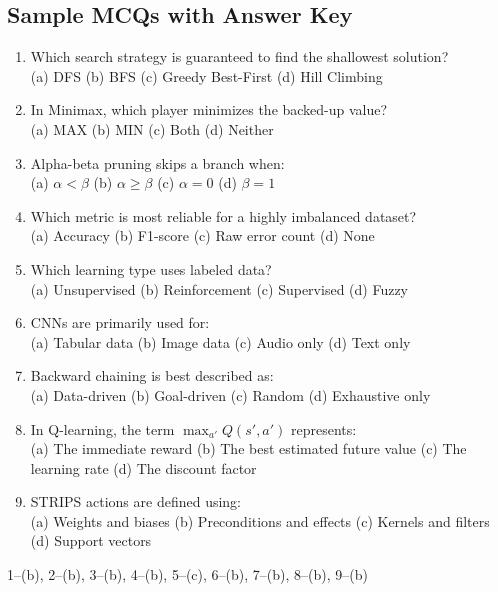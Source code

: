 \documentclass[11pt,a4paper]{article}
\begin{document}
\subsection{Sample MCQs with Answer Key}
\begin{enumerate}[leftmargin=*]
  \item Which search strategy is guaranteed to find the shallowest solution?\\
  (a) DFS \quad (b) BFS \quad (c) Greedy Best-First \quad (d) Hill Climbing
  \item In Minimax, which player minimizes the backed-up value?\\
  (a) MAX \quad (b) MIN \quad (c) Both \quad (d) Neither
  \item Alpha-beta pruning skips a branch when:\\
  (a) $\alpha < \beta$ \quad (b) $\alpha \geq \beta$ \quad (c) $\alpha = 0$ \quad (d) $\beta = 1$
  \item Which metric is most reliable for a highly imbalanced dataset?\\
  (a) Accuracy \quad (b) F1-score \quad (c) Raw error count \quad (d) None
  \item Which learning type uses labeled data?\\
  (a) Unsupervised \quad (b) Reinforcement \quad (c) Supervised \quad (d) Fuzzy
  \item CNNs are primarily used for:\\
  (a) Tabular data \quad (b) Image data \quad (c) Audio only \quad (d) Text only
  \item Backward chaining is best described as:\\
  (a) Data-driven \quad (b) Goal-driven \quad (c) Random \quad (d) Exhaustive only
  \item In Q-learning, the term $\max_{a'}Q(s',a')$ represents:\\
  (a) The immediate reward \quad (b) The best estimated future value \quad (c) The learning rate \quad (d) The discount factor
  \item STRIPS actions are defined using:\\
  (a) Weights and biases \quad (b) Preconditions and effects \quad (c) Kernels and filters \quad (d) Support vectors
\end{enumerate}
\begin{conceptbox}
1--(b), 2--(b), 3--(b), 4--(b), 5--(c), 6--(b), 7--(b), 8--(b), 9--(b)
\end{conceptbox}

\end{document}
